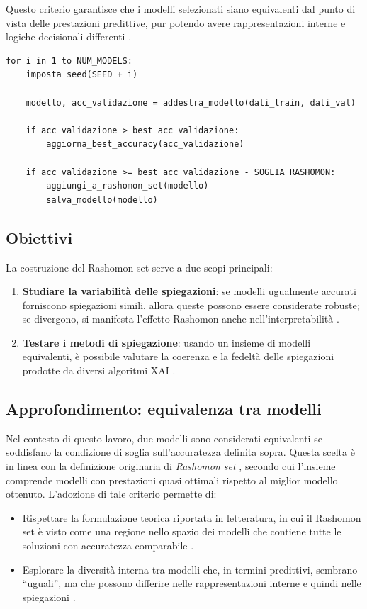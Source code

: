 \documentclass{article}
\begin{document}
Questo criterio garantisce che i modelli selezionati siano equivalenti dal
punto di vista delle prestazioni predittive, pur potendo avere rappresentazioni
interne e logiche decisionali differenti
\citep{leventi2023consistency,mueller2023rashomon}.

\begin{lstlisting}[caption={Addestramento modelli e selezione Rashomon set}, label={lst:rashomon_training}]
for i in 1 to NUM_MODELS:
    imposta_seed(SEED + i)
    
    modello, acc_validazione = addestra_modello(dati_train, dati_val)
    
    if acc_validazione > best_acc_validazione:
        aggiorna_best_accuracy(acc_validazione)

    if acc_validazione >= best_acc_validazione - SOGLIA_RASHOMON:
        aggiungi_a_rashomon_set(modello)
        salva_modello(modello)
\end{lstlisting}

\subsection{Obiettivi}
La costruzione del Rashomon set serve a due scopi principali:
\begin{enumerate}
      \item \textbf{Studiare la variabilità delle spiegazioni}: se modelli ugualmente accurati forniscono spiegazioni simili, allora queste possono essere considerate robuste; se divergono, si manifesta l’effetto Rashomon anche nell’interpretabilità \citep{mueller2023rashomon}.
      \item \textbf{Testare i metodi di spiegazione}: usando un insieme di modelli equivalenti, è possibile valutare la coerenza e la fedeltà delle spiegazioni prodotte da diversi algoritmi XAI \citep{leventi2023consistency}.
\end{enumerate}

\subsection{Approfondimento: equivalenza tra modelli}
Nel contesto di questo lavoro, due modelli sono considerati equivalenti se
soddisfano la condizione di soglia sull’accuratezza definita sopra. Questa
scelta è in linea con la definizione originaria di \emph{Rashomon set}
\citep{fisher2019all}, secondo cui l’insieme comprende modelli con prestazioni
quasi ottimali rispetto al miglior modello ottenuto. L’adozione di tale
criterio permette di:
\begin{itemize}
      \item Rispettare la formulazione teorica riportata in letteratura, in cui il Rashomon
            set è visto come una regione nello spazio dei modelli che contiene tutte le
            soluzioni con accuratezza comparabile \citep{mueller2023rashomon}.
      \item Esplorare la diversità interna tra modelli che, in termini predittivi, sembrano
            “uguali”, ma che possono differire nelle rappresentazioni interne e quindi
            nelle spiegazioni \citep{leventi2023consistency}.
\end{itemize}
\end{document}
